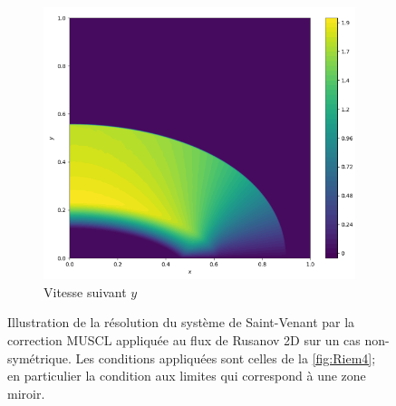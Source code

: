 \documentclass[
	french,
	11pt, %
]{fphw}
\begin{document}
\begin{figure}[H]
\begin{subfigure}{0.32\textwidth}
		\label{fig:Muscl2u}
	\end{subfigure}
	\begin{subfigure}{0.32\textwidth}
		\centering
		\includegraphics[width=\textwidth,height=0.85\textwidth]{Muscl2v.png}
		\caption{Vitesse suivant $y$}
		\label{fig:Muscl2v}
	\end{subfigure}
	\caption{Illustration de la résolution du système de Saint-Venant par la correction MUSCL appliquée au flux de Rusanov 2D sur un cas non-symétrique. Les conditions appliquées sont celles de la \cref{fig:Riem4}; en particulier la condition aux limites qui correspond à une zone miroir.}
	\label{fig:Muscl2}
\end{figure}
\end{document}
